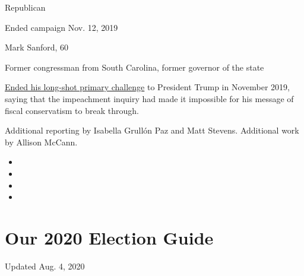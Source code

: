 Republican

Ended campaign Nov. 12, 2019

Mark Sanford, 60

Former congressman from South Carolina, former governor of the state

\href{https://www.nytimes3xbfgragh.onion/2019/11/12/us/politics/mark-sanford-2020.html}{Ended
his long-shot primary challenge} to President Trump in November 2019,
saying that the impeachment inquiry had made it impossible for his
message of fiscal conservatism to break through.

Additional reporting by Isabella Grullón Paz and Matt Stevens.
Additional work by Allison McCann.

\begin{itemize}
\item
\item
\item
\item
\end{itemize}

\hypertarget{our-2020-election-guide}{%
\section{Our 2020 Election Guide}\label{our-2020-election-guide}}

Updated Aug. 4, 2020

